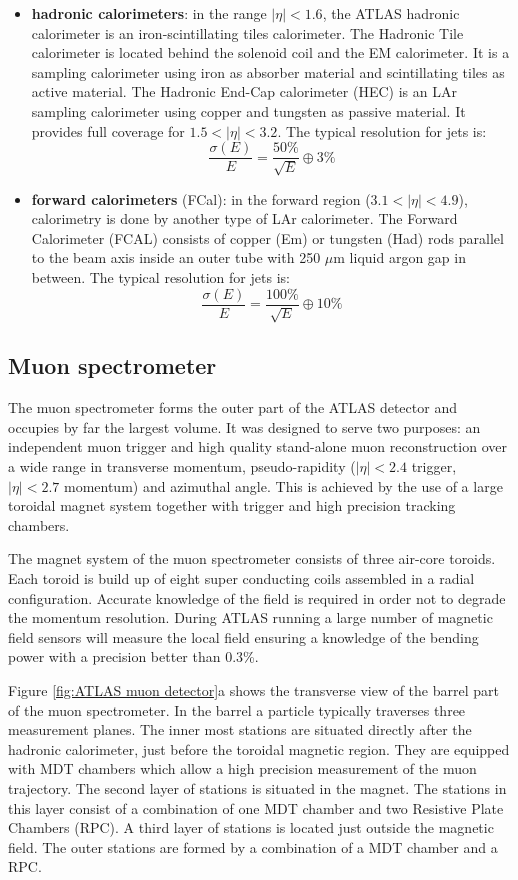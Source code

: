 \documentclass[a4paper, oneside, 11pt, openright]{book}
\begin{document}
\begin{itemize}
\begin{table}[h!]
						\end{table}
										
						\item \textbf{hadronic calorimeters}:
						in the range $|\eta|<1.6$, the ATLAS hadronic calorimeter is an iron-scintillating tiles calorimeter. The Hadronic Tile calorimeter is located behind the solenoid coil and the EM calorimeter. It is a sampling calorimeter using iron as absorber material and scintillating tiles as active material. The Hadronic End-Cap calorimeter (HEC) is an LAr sampling calorimeter using copper and tungsten as passive material. It provides full coverage for $1.5<|\eta|<3.2$. The typical resolution for jets is:
						$$ 
						\frac{\sigma(E)}{E} = \frac{50\%}{\sqrt{E}} \oplus 3\%
						$$
						\item \textbf{forward calorimeters} (FCal):
						in the forward region ($3.1<|\eta|<4.9$), calorimetry is done by another type of LAr calorimeter. The Forward Calorimeter (FCAL) consists of copper (Em) or tungsten (Had) rods parallel to the beam axis inside an outer tube with 250 $\mu$m liquid argon gap in between. The typical resolution for jets is:
						$$ 
						\frac{\sigma(E)}{E} = \frac{100\%}{\sqrt{E}} \oplus 10\%
						$$
					\end{itemize}
		
		
				\subsection{Muon spectrometer}
					\cite{Muon system}The  muon  spectrometer  forms  the  outer  part  of  the  ATLAS  detector  and occupies by far the largest volume. It was designed to serve two purposes: an independent muon trigger and high quality stand-alone muon reconstruction over a wide range in transverse momentum, pseudo-rapidity ($|\eta|<2.4$ trigger, $|\eta|<2.7$ momentum) and azimuthal angle. This is achieved by the use of a large toroidal magnet system together with trigger and high precision tracking chambers.
					
					The magnet system of the muon spectrometer consists of three air-core toroids. Each toroid is build up of eight super conducting coils assembled in a radial configuration. Accurate knowledge of the field is required in order not to degrade the momentum resolution. During ATLAS running a large number of magnetic field sensors will measure the local field ensuring a knowledge of the bending power with a precision better than 0.3\%. 
					
					Figure \ref{fig:ATLAS muon detector}a shows the transverse view of the barrel part of the muon spectrometer. In the barrel a particle typically traverses three measurement planes. The inner most stations are situated directly after the hadronic calorimeter, just before the toroidal magnetic region. They are equipped with MDT chambers which allow a high precision measurement of the muon trajectory. The second layer of stations is situated in the magnet. The stations in this layer consist of a combination of one MDT chamber and two Resistive Plate Chambers (RPC). A third layer of stations is located just outside the magnetic field. The outer stations are formed by a combination of a MDT chamber and a RPC.
					
\end{document}
